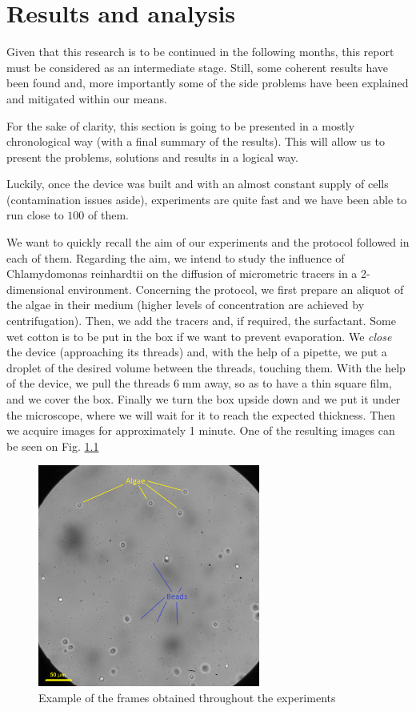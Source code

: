 \chapter{Results and analysis}
\label{results_analysis}

Given that this research is to be continued in the following months, this report must be considered as an intermediate stage. Still, some coherent results have been found and, more importantly some of the side problems have been explained and mitigated within our means.

For the sake of clarity, this section is going to be presented in a mostly chronological way (with a final summary of the results). This will allow us to present the problems, solutions and results in a logical way.

Luckily, once the device was built and with an almost constant supply of cells (contamination issues aside), experiments are quite fast and we have been able to run close to $100$ of them.

We want to quickly recall the aim of our experiments and the protocol followed in each of them. Regarding the aim, we intend to study the influence of Chlamydomonas reinhardtii on the diffusion of micrometric tracers in a 2-dimensional environment. Concerning the protocol, we first prepare an aliquot of the algae in their medium (higher levels of concentration are achieved by centrifugation). Then, we add the tracers and, if required, the surfactant. Some wet cotton is to be put in the box if we want to prevent evaporation. We \textit{close} the device (approaching its threads) and, with the help of a pipette, we put a droplet of the desired volume between the threads, touching them. With the help of the device, we pull the threads $6 \; \textrm{mm}$ away, so as to have a thin square film, and we cover the box. Finally we turn the box upside down and we put it under the microscope, where we will wait for it to reach the expected thickness. Then we acquire images for approximately 1 minute. One of the resulting images can be seen on Fig. \ref{frame_e3}

\begin{figure}[H]
	\centering
	\includegraphics[width=0.65\textwidth]{archivos/e3_randomframe.png}
	\caption{Example of the frames obtained throughout the experiments}
	\label{frame_e3}
\end{figure}

